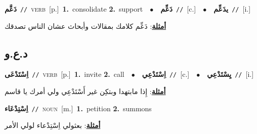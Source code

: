\documentclass[10pt,a4paper,twoside]{article} %
\begin{document}
\begin{multicols}{2}
{\setlength\topsep{0pt}\textbf{\foreignlanguage{arabic}{دَعَّم}}\ {\color{gray}\texttt{//}\color{black}}\ \textsc{verb}\ [p.]\ \textbf{1.}~consolidate  \textbf{2.}~support\ \ $\bullet$\ \ \setlength\topsep{0pt}\textbf{\foreignlanguage{arabic}{دَعِّم}}\ {\color{gray}\texttt{//}\color{black}}\ [c.]\ \ $\bullet$\ \ \setlength\topsep{0pt}\textbf{\foreignlanguage{arabic}{يدَعِّم}}\ {\color{gray}\texttt{//}\color{black}}\ [i.]\  \begin{flushright}\color{gray}\foreignlanguage{arabic}{\textbf{\underline{\foreignlanguage{arabic}{أمثلة}}}: دَعِّم كلامك بمقالات وأبحاث عشان الناس تصدقك}\end{flushright}\color{black}} \vspace{2mm}

\vspace{-3mm}
\subsection*{\color{blue}\foreignlanguage{arabic}{د.ع.و}\color{blue}{}} 

{\setlength\topsep{0pt}\textbf{\foreignlanguage{arabic}{اِسْتَدْعَى}}\ {\color{gray}\texttt{//}\color{black}}\ \textsc{verb}\ [p.]\ \textbf{1.}~invite  \textbf{2.}~call\ \ $\bullet$\ \ \setlength\topsep{0pt}\textbf{\foreignlanguage{arabic}{اِسْتَدْعِي}}\ {\color{gray}\texttt{//}\color{black}}\ [c.]\ \ $\bullet$\ \ \setlength\topsep{0pt}\textbf{\foreignlanguage{arabic}{يِسْتَدْعِي}}\ {\color{gray}\texttt{//}\color{black}}\ [i.]\  \begin{flushright}\color{gray}\foreignlanguage{arabic}{\textbf{\underline{\foreignlanguage{arabic}{أمثلة}}}: إِذا مابتهدا وبتكِن غير أَسْتَدْعِي ولي أمرك يا قاسم}\end{flushright}\color{black}} \vspace{2mm}

{\setlength\topsep{0pt}\textbf{\foreignlanguage{arabic}{اِسْتِدْعَاء}}\ {\color{gray}\texttt{//}\color{black}}\ \textsc{noun}\ [m.]\ \textbf{1.}~petition  \textbf{2.}~summons\  \begin{flushright}\color{gray}\foreignlanguage{arabic}{\textbf{\underline{\foreignlanguage{arabic}{أمثلة}}}: بعثولي اِسْتِدْعاء لولي الأمر}\end{flushright}\color{black}} \vspace{2mm}


\end{multicols}
\end{document}
